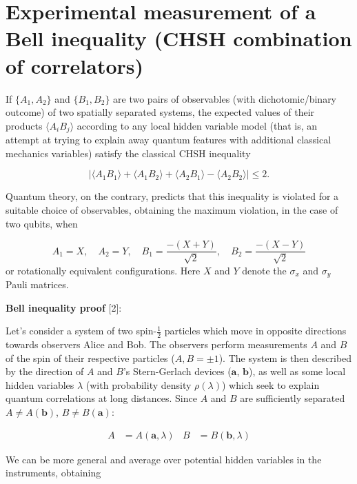 \documentclass[11pt,dvipsnames]{article}
\begin{document}
    \section*{\texorpdfstring{\textbf{Experimental measurement of a
Bell inequality (CHSH combination of
correlators)}}{Experimental measurement of a Bell inequality   (CHSH combination of correlators)}}\label{experimental-measurement-of-a-bell-inequality-chsh-combination-of-correlators}

{\color{teal}If \(\{A_1, A_2\}\) and \(\{B_1,B_2\}\) are two pairs of observables
(with dichotomic/binary outcome) of two spatially separated systems, the
expected values of their products \(\langle A_i B_j \rangle\) according
to any local hidden variable model (that is, an attempt at trying to
explain away quantum features with additional classical mechanics
variables) satisfy the classical CHSH inequality

\[
|\langle A_1 B_1\rangle +\langle A_1 B_2\rangle + \langle A_2 B_1\rangle - \langle A_2 B_2\rangle|\leq 2 .
\]

Quantum theory, on the contrary, predicts that this inequality is
violated for a suitable choice of observables, obtaining the maximum
violation, in the case of two qubits, when

\[
A_1=X,\quad A_2=Y, \quad B_1=\frac{-(X+Y)}{\sqrt{2}}, \quad B_2=\frac{-(X-Y)}{\sqrt{2}}
\] or rotationally equivalent configurations. Here \(X\) and \(Y\)
denote the \(\sigma_x\) and \(\sigma_y\) Pauli matrices.}

\textbf{Bell inequality proof} [2]:

Let's consider a system of two spin-$\tfrac{1}{2}$ particles which move in opposite directions towards observers Alice and Bob. The observers perform measurements $A$ and $B$ of the spin of their respective particles ($A,B=\pm1$). The system is then described by the direction of $A$ and $B$'s Stern-Gerlach devices ($\mathbf{a}$, $\mathbf{b}$), as well as some local hidden variables $\lambda$ (with probability density $\rho(\lambda)$) which seek to explain quantum correlations at long distances. Since $A$ and $B$ are sufficiently separated $A\neq A(\mathbf{b})$, $B\neq B(\mathbf{a})$:

$$
\begin{aligned}
A &= A(\mathbf{a}, \lambda) & B &= B(\mathbf{b}, \lambda)
\end{aligned}
$$

We can be more general and average over potential hidden variables in the instruments, obtaining
\end{document}
